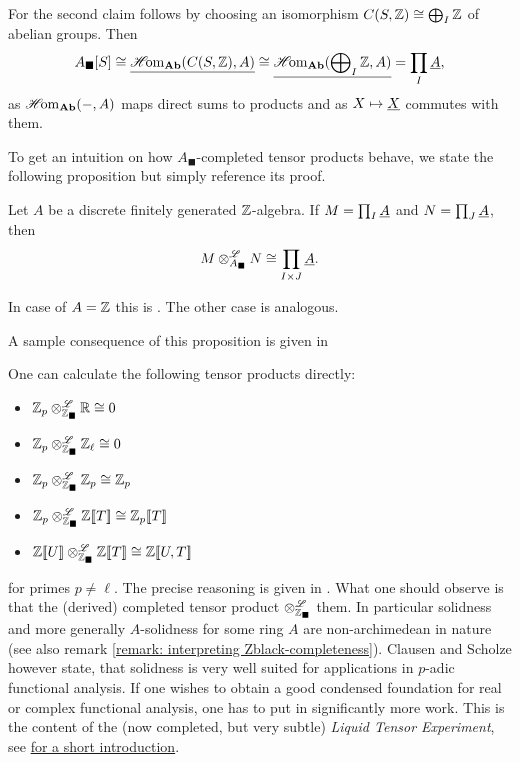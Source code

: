 \begin{proofsketch}
	For the second claim follows by choosing an isomorphism ${C(S, {\mathbb{Z}})}\cong \bigoplus_I {\mathbb{Z}}$ of abelian groups. Then
		$${A_\blacksquare[S]} \cong \underline{{\operatorname{\mathscr{H}\!om}}_{{\mathbf{Ab}}}({C(S, {\mathbb{Z}})}, A)} \cong \underline{{\operatorname{\mathscr{H}\!om}}_{{\mathbf{Ab}}}(\bigoplus\nolimits_I {\mathbb{Z}}, A)}=\prod_I \underline{A},$$
	as ${\operatorname{\mathscr{H}\!om}}_{{\mathbf{Ab}}}(-, A)$ maps direct sums to products and as $X\mapsto\underline{X}$ commutes with them.
\end{proofsketch}

To get an intuition on how $A_\blacksquare$-completed tensor products behave, we state the following proposition but simply reference its proof.
\begin{proposition}
	\label{proposition: tensor products of compacts, f.g. case}
	
	Let $A$ be a discrete finitely generated ${\mathbb{Z}}$-algebra. If $M=\prod_I \underline{A}$ and $N=\prod_J \underline{A}$, then
	$$M\otimes^{\mathscr{L}}_{A_\blacksquare} N \cong \prod_{I\times J} \underline{A}.$$
\end{proposition}
\begin{shortproof}
	In case of $A={\mathbb{Z}}$ this is \cite[Prop. 6.3]{condenseddotpdf}. The other case is analogous.
\end{shortproof}

A sample consequence of this proposition is given in
\begin{example}
	One can calculate the following tensor products directly:
	\begin{itemize}
		\item ${\mathbb{Z}}_p \otimes^{\mathscr{L}}_{{\mathbb{Z}}_\blacksquare} {\mathbb{R}} \cong 0$
		\item ${\mathbb{Z}}_p \otimes^{\mathscr{L}}_{{\mathbb{Z}}_\blacksquare} {\mathbb{Z}}_\ell \cong 0$
		\item ${\mathbb{Z}}_p \otimes^{\mathscr{L}}_{{\mathbb{Z}}_\blacksquare} {\mathbb{Z}}_p \cong {\mathbb{Z}}_p$
		\item ${\mathbb{Z}}_p \otimes^{\mathscr{L}}_{{\mathbb{Z}}_\blacksquare} {{\mathbb{Z}}[\![T]\!]} \cong {{\mathbb{Z}}_p[\![T]\!]}$
		\item ${{\mathbb{Z}}[\![U]\!]} \otimes^{\mathscr{L}}_{{\mathbb{Z}}_\blacksquare} {{\mathbb{Z}}[\![T]\!]} \cong {{\mathbb{Z}}[\![U, T]\!]}$
	\end{itemize}
	for primes $p\ne \ell$. The precise reasoning is given in \cite[Example 6.4]{condenseddotpdf}. What one should observe is that the (derived) completed tensor product $\otimes^{\mathscr{L}}_{{\mathbb{Z}}_\blacksquare}$  them. In particular solidness and more generally $A$-solidness for some ring $A$ are non-archimedean in nature (see also remark \ref{remark: interpreting Zblack-completeness}). Clausen and Scholze however state, that solidness is very well suited for applications in $p$-adic functional analysis. If one wishes to obtain a good condensed foundation for real or complex functional analysis, one has to put in significantly more work. This is the content of the (now completed, but very subtle) \emph{Liquid Tensor Experiment}, see \href{https://xenaproject.wordpress.com/2020/12/05/liquid-tensor-experiment/}{for a short introduction}. 
\end{example}

